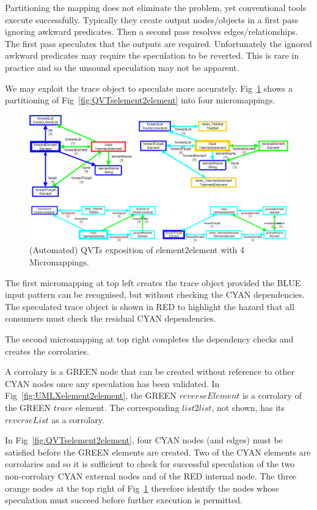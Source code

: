 \documentclass{llncs}
\begin{document}
Partitioning the mapping does not eliminate the problem, yet conventional tools execute successfully. Typically they create output nodes/objects in a first pass ignoring awkward predicates. Then a second pass resolves edges/relationships. The first pass speculates that the outputs are required. Unfortunately the ignored awkward predicates may require the speculation to be reverted. This is rare in practice and so the unsound speculation may not be apparent.

We may exploit the trace object to speculate more accurately. Fig~\ref{fig:QVTsMicromappings} shows a partitioning of Fig~\ref{fig:QVTselement2element} into four micromappings.

\begin{figure}[h]
	\centering
	\includegraphics[width=1.0\textwidth]{QVTsMicromappings.png}
	\caption{(Automated) QVTs exposition of element2element with 4 Micromappings.}
	\label{fig:QVTsMicromappings}
\end{figure}

The first micromapping at top left creates the trace object provided the BLUE input pattern can be recognised, but without checking the CYAN dependencies. The speculated trace object is shown in RED to highlight the hazard that all consumers must check the residual CYAN dependencies.

The second micromapping at top right completes the dependency checks and creates the corrolaries.

A corrolary is a GREEN node that can be created without reference to other CYAN nodes once any speculation has been validated. In Fig~\ref{fig:UMLXelement2element}, the GREEN $reverseElement$ is a corrolary of the GREEN $trace$ element. The corresponding $list2list$, not shown, has its $reverseList$ as a corrolary.

In Fig~\ref{fig:QVTselement2element}, four CYAN nodes (and edges) must be satisfied before the GREEN elements are created. Two of the CYAN elements are corrolaries and so it is sufficient to check for successful speculation of the two non-corrolary CYAN external nodes and of the RED internal node. The three orange nodes at the top right of Fig~\ref{fig:QVTsMicromappings} therefore identify the nodes whose speculation must succeed before further execution is permitted.
\end{document}
